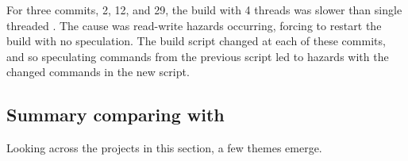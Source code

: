 For three commits, 2, 12, and 29, the \Rattle build with 4 threads was slower than single threaded \Rattle.  The cause was read-write hazards occurring, forcing \Rattle to restart the build with no speculation.  The build script changed at each of these commits, and so \Rattle speculating commands from the previous script led to hazards with the changed commands in the new script.








\subsection{Summary comparing with \Make}

Looking across the projects in this section, a few themes emerge.

